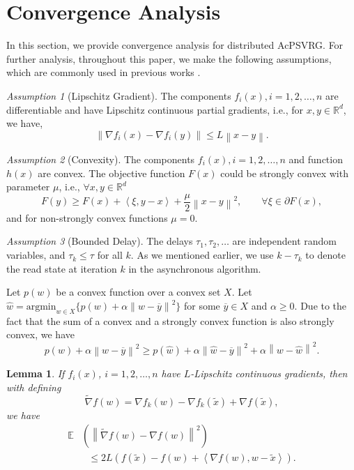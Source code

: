 \documentclass[conference]{IEEEtran}
\newcommand*{\R}{\mathbb{R}}
\newcommand*{\E}{\mathbb{E}}
\newcommand{\norm}[1]{\left\lVert#1\right\rVert}
\newcommand{\Iprod}[2]{\left\langle #1,#2\right\rangle}
\newtheorem{lemma}[theorem]{Lemma}
\theoremstyle{definition}
\theoremstyle{remark}
\newtheorem{Assumption}{Assumption}
\begin{document}
\section{Convergence Analysis}
In this section, we provide convergence analysis for distributed AcPSVRG. For further analysis, throughout this paper, we make the following assumptions, which are commonly used in previous works \cite{Reddi2015, Meng2016}.

\begin{Assumption}[Lipschitz Gradient]\label{Assump1}
The components $f_i(x), i=1,2,\ldots,n$ are differentiable and have Lipschitz continuous partial gradients, i.e., for $x,y\in \R^d$, we have,
\begin{equation}
    \norm{\nabla f_i(x) - \nabla f_i(y)} \leq L \norm{x-y}.
\end{equation}
\end{Assumption}
\begin{Assumption}[Convexity]\label{Assump2}
The components $f_i(x), i=1,2,\ldots,n$ and function $h(x)$ are convex. The objective function $F(x)$ could be strongly convex with parameter $\mu$, i.e., 
$\forall x,y \in \R^d$
\begin{equation}\label{Convex:Eq1}
F(y)\geq F(x) + \Iprod{\xi}{y-x} + \frac{\mu}{2}\norm{x-y}^2,\qquad \forall \xi\in\partial F(x),
\end{equation}
and for non-strongly convex functions $\mu=0$. 
\end{Assumption}

\begin{Assumption}[Bounded Delay]\label{Assump3}
The delays $\tau_1,\tau_2,\ldots$ are independent random variables, and $\tau_k\leq \tau$ for all $k$. As we mentioned earlier, we use $k-\tau_k$ to denote the read state at iteration $k$ in the asynchronous algorithm.
\end{Assumption}

Let $p(w)$ be a convex function over a convex set $X$. Let $\hat{w} = \text{argmin}_{w\in X}\{p(w)+\alpha\norm{w-\overline{y}}^2\}$ for some $\overline{y}\in X$ and $\alpha\geq 0$. Due to the fact that the sum of a convex and a strongly convex function is also strongly convex,  we have
\begin{equation}\label{threepoint-convex}
 p(w)+\alpha\norm{w-\overline{y}}^2 \geq p(\hat{w})+\alpha\norm{\hat{w}-\overline{y}}^2+\alpha\norm{w-\hat{w}}^2.
\end{equation}


\begin{lemma}\label{lemma0}\cite{Johnson12,Allen-Zhu17} If $f_i(x)$, $i=1,2,\ldots,n$ have $L$-Lipschitz continuous gradients, then with defining 
\[
\widetilde{\nabla} f(w) = \nabla f_k(w) - \nabla f_k(\widetilde{x})+ \nabla f(\widetilde{x}),
\]
we have
\begin{equation}
\begin{split}
\E&\left(\norm{\widetilde{\nabla} f(w)-\nabla f(w)}^2\right)\\
&~~~\leq 2L (f(\widetilde{x})-f(w)+\Iprod{\nabla f(w)}{w-\widetilde{x}}).
\end{split}
\end{equation}
\end{lemma}
\end{document}
